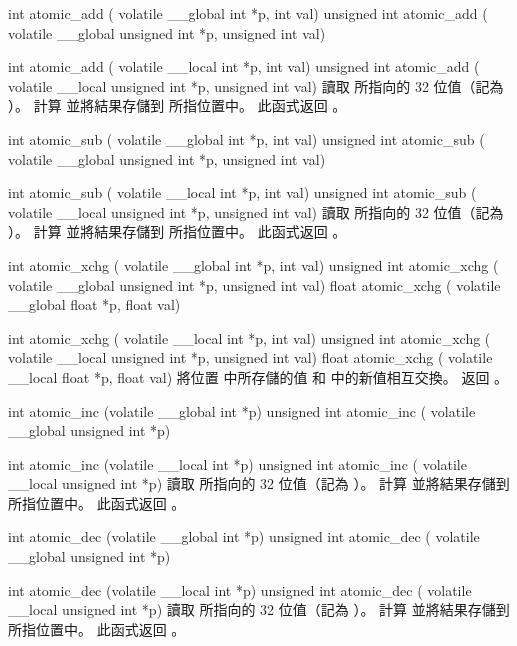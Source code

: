 int atomic_add (
	volatile __global int *p,
	int val) 
unsigned int atomic_add ( 
	volatile __global unsigned int *p, 
	unsigned int val)

int atomic_add (
	volatile __local int *p,
	int val)
unsigned int atomic_add (
	volatile __local unsigned int *p,
	unsigned int val)
\stopbuffer
{}
讀取  所指向的 32 位值（記為 ）。
計算  並將結果存儲到  所指位置中。
此函式返回 。
\stopbuffer

int atomic_sub (
	volatile __global int *p,
	int val) 
unsigned int atomic_sub ( 
	volatile __global unsigned int *p, 
	unsigned int val)

int atomic_sub (
	volatile __local int *p,
	int val)
unsigned int atomic_sub (
	volatile __local unsigned int *p,
	unsigned int val)
\stopbuffer
{}
讀取  所指向的 32 位值（記為 ）。
計算  並將結果存儲到  所指位置中。
此函式返回 。
\stopbuffer

int atomic_xchg (
	volatile __global int *p,
	int val)
unsigned int atomic_xchg (
	volatile __global unsigned int *p,
	unsigned int val)
float atomic_xchg (
	volatile __global float *p,
	float val)

int atomic_xchg (
	volatile __local int *p,
	int val)
unsigned int atomic_xchg (
	volatile __local unsigned int *p,
	unsigned int val)
float atomic_xchg (
	volatile __local float *p,
	float val)
\stopbuffer
{}
將位置  中所存儲的值  和  中的新值相互交換。
返回 。
\stopbuffer

int atomic_inc (volatile __global int *p)
unsigned int atomic_inc (
	volatile __global unsigned int *p)

int atomic_inc (volatile __local int *p)
unsigned int atomic_inc (
	volatile __local unsigned int *p)
\stopbuffer
{}
讀取  所指向的 32 位值（記為 ）。
計算  並將結果存儲到  所指位置中。
此函式返回 。
\stopbuffer

int atomic_dec (volatile __global int *p)
unsigned int atomic_dec (
	volatile __global unsigned int *p)

int atomic_dec (volatile __local int *p)
unsigned int atomic_dec (
	volatile __local unsigned int *p)
\stopbuffer
{}
讀取  所指向的 32 位值（記為 ）。
計算  並將結果存儲到  所指位置中。
此函式返回 。
\stopbuffer

